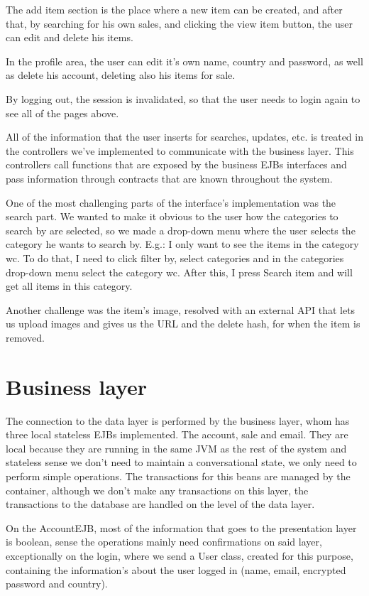 \documentclass{article}
\begin{document}
\qquad The add item section is the place where a new item can be created, and after that, by searching for his own sales, and clicking the view item button, the user can edit and delete his items.

\qquad In the profile area, the user can edit it's own name, country and password, as well as delete his account, deleting also his items for sale.

\qquad By logging out, the session is invalidated, so that the user needs to login again to see all of the pages above. 

\qquad All of the information that the user inserts for searches, updates, etc. is treated in the controllers we've implemented to communicate with the business layer. This controllers call functions that are exposed by the business \ac{EJB}s interfaces and pass information through contracts that are known throughout the system.

\qquad One of the most challenging parts of the interface's implementation was the search part. We wanted to make it obvious to the user how the categories to search by are selected, so we made a drop-down menu where the user selects the category he wants to search by. E.g.: I only want to see the items in the category wc. To do that, I need to click filter by, select categories and in the categories drop-down menu select the category wc. After this, I press Search item and will get all items in this category.

\qquad Another challenge was the item's image, resolved with an external API that lets us upload images and gives us the URL and the delete hash, for when the item is removed.



\section{Business layer}

\qquad The connection to the data layer is performed by the business layer, whom has three local stateless \ac{EJB}s implemented. The account, sale and email. They are local because they are running in the same \ac{JVM} as the rest of the system and stateless sense we don't need to maintain a conversational state, we only need to perform simple operations. The transactions for this beans are managed by the container, although we don't make any transactions on this layer, the transactions to the database are handled on the level of the data layer.

\qquad On the AccountEJB, most of the information that goes to the presentation layer is boolean, sense the operations mainly need confirmations on said layer, exceptionally on the login, where we send a User class, created for this purpose, containing the information's about the user logged in (name, email, encrypted password and country).
\end{document}
